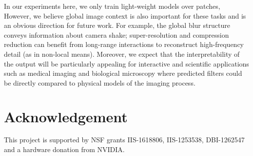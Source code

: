 \documentclass[10pt,twocolumn,letterpaper]{article}
\begin{document}
In our experiments here, we only train light-weight models over patches,
However, we believe global image context is also important for these tasks
and is an obvious direction for future work.  For example, the global blur
structure conveys information about camera shake; super-resolution and
compression reduction can benefit from long-range interactions to reconstruct
high-frequency detail (as in non-local means). Moreover, we expect that the
interpretability of the output will be particularly appealing for interactive
and scientific applications such as medical imaging and biological microscopy
where predicted filters could be directly compared to physical models of the
imaging process.

\section*{Acknowledgement}
This project is supported by NSF grants IIS-1618806, IIS-1253538, DBI-1262547 and a hardware donation from NVIDIA.



{\small


}


\newpage\newpage

\end{document}
